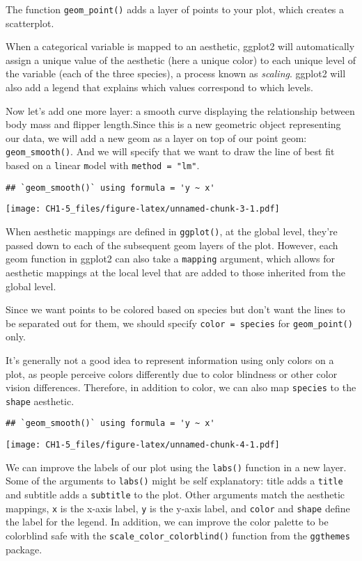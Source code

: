 \documentclass[
]{article}
\begin{document}
The function \texttt{geom\_point()} adds a layer of points to your plot,
which creates a scatterplot.

When a categorical variable is mapped to an aesthetic, ggplot2 will
automatically assign a unique value of the aesthetic (here a unique
color) to each unique level of the variable (each of the three species),
a process known as \emph{scaling}. ggplot2 will also add a legend that
explains which values correspond to which levels.

Now let's add one more layer: a smooth curve displaying the relationship
between body mass and flipper length.Since this is a new geometric
object representing our data, we will add a new geom as a layer on top
of our point geom: \texttt{geom\_smooth()}. And we will specify that we
want to draw the line of best fit based on a \texttt{l}inear
\texttt{m}odel with \texttt{method\ =\ "lm"}.

\begin{verbatim}
## `geom_smooth()` using formula = 'y ~ x'
\end{verbatim}

\texttt{[image: CH1-5\_files/figure-latex/unnamed-chunk-3-1.pdf]}

When aesthetic mappings are defined in \texttt{ggplot()}, at the global
level, they're passed down to each of the subsequent geom layers of the
plot. However, each geom function in ggplot2 can also take a
\texttt{mapping} argument, which allows for aesthetic mappings at the
local level that are added to those inherited from the global level.

Since we want points to be colored based on species but don't want the
lines to be separated out for them, we should specify
\texttt{color\ =\ species} for \texttt{geom\_point()} only.

It's generally not a good idea to represent information using only
colors on a plot, as people perceive colors differently due to color
blindness or other color vision differences. Therefore, in addition to
color, we can also map \texttt{species} to the \texttt{shape} aesthetic.

\begin{verbatim}
## `geom_smooth()` using formula = 'y ~ x'
\end{verbatim}

\texttt{[image: CH1-5\_files/figure-latex/unnamed-chunk-4-1.pdf]}

We can improve the labels of our plot using the \texttt{labs()} function
in a new layer. Some of the arguments to \texttt{labs()} might be self
explanatory: title adds a \texttt{title} and subtitle adds a
\texttt{subtitle} to the plot. Other arguments match the aesthetic
mappings, \texttt{x} is the x-axis label, \texttt{y} is the y-axis
label, and \texttt{color} and \texttt{shape} define the label for the
legend. In addition, we can improve the color palette to be colorblind
safe with the \texttt{scale\_color\_colorblind()} function from the
\texttt{ggthemes} package.
\end{document}
